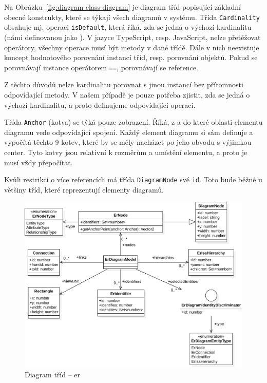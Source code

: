 Na Obrázku~\ref{fig:diagram-class-diagram} je diagram tříd popisující základní obecné konstrukty, které se týkají všech diagramů v systému.
Třída \texttt{Cardinality} obsahuje mj. operaci \texttt{isDefault}, která říká, zda se jedná o výchozí kardinalitu (námi definovanou jako \oneone).
V jazyce TypeScript, resp. JavaScript, nelze přetěžovat operátory, všechny operace musí být metody v dané třídě.
Dále v nich neexistuje koncept hodnotového porovnání instancí tříd, resp. porovnání objektů.
Pokud se porovnávají instance operátorem \texttt{==}, porovnávají se reference.

Z těchto důvodů nelze kardinalitu porovnat s jinou instancí bez přítomnosti odpovídající metody.
V našem případě je pouze potřeba zjistit, zda se jedná o výchozí kardinalitu, a proto definujeme odpovídající operaci.

Třída \texttt{Anchor} (kotva) se týká pouze zobrazení.
Říká, z a do které oblasti elementu diagramu vede odpovídající spojení.
Každý element diagramu si sám definuje a vypočítá těchto 9 kotev, které by se měly nacházet po jeho obvodu s výjimkou center.
Tyto kotvy jsou relativní k rozměrům a umístění elementu, a proto je musí vždy přepočítat.

Kvůli restrikci o více referencích má třída \texttt{DiagramNode} své \texttt{id}.
Toto bude běžné u většiny tříd, které reprezentují elementy diagramů.

\begin{figure}[!htb]
  \centering
  \includegraphics[width=\maxwidth{\textwidth}]{../img/diagrams/er-class-diagram.pdf}
  \caption{Diagram tříd -- \acrshort{er}}
  \label{fig:er-class-diagram}
\end{figure}

